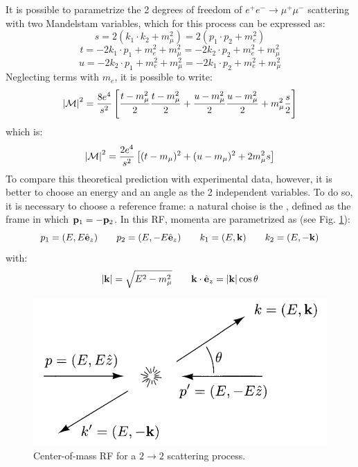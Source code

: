 It is possible to parametrize the 2 degrees of freedom of $ e^+e^- \rightarrow \mu^+\mu^- $ scattering with two Mandelstam variables, which for this process can be expressed as:
\begin{equation*}
  s = 2 (k_1 \cdot k_2 + m_\mu^2) = 2 (p_1 \cdot p_2 + m_e^2)
\end{equation*}
\begin{equation*}
  t = -2 k_1 \cdot p_1 + m_e^2 + m_\mu^2 = -2 k_2 \cdot p_2 + m_e^2 + m_\mu^2
\end{equation*}
\begin{equation*}
  u = -2 k_2 \cdot p_1 + m_e^2 + m_\mu^2 = -2 k_1 \cdot p_2 + m_e^2 + m_\mu^2
\end{equation*}
Neglecting terms with $ m_e $, it is possible to write:
\begin{equation*}
  \left\lvert\mathcal{M}\right\rvert^2 = \frac{8e^4}{s^2} \left[ \frac{t - m_\mu^2}{2} \frac{t - m_\mu^2}{2} + \frac{u - m_\mu^2}{2} \frac{u - m_\mu^2}{2} + m_\mu^2 \frac{s}{2} \right]
\end{equation*}
which is:
\begin{equation}
  \left\lvert\mathcal{M}\right\rvert^2 = \frac{2e^4}{s^2} \left[ (t - m_\mu)^2 + (u - m_\mu)^2 + 2m_\mu^2 s \right]
  \label{eq:mat-el-mand}
\end{equation}
To compare this theoretical prediction with experimental data, however, it is better to choose an energy and an angle as the 2 independent variables. To do so, it is necessary to choose a reference frame: a natural choise is the , defined as the frame in which $ \mathbf{p}_1 = - \mathbf{p}_2 $. In this RF, momenta are parametrized as (see Fig. \ref{com-rf}):
\begin{equation*}
  p_1 = (E, E \hat{\mathbf{e}}_z) \qquad p_2 = (E, -E \hat{\mathbf{e}}_z) \qquad k_1 = (E, \mathbf{k}) \qquad k_2 = (E, -\mathbf{k})
\end{equation*}
with:
\begin{equation*}
  \left\lvert\mathbf{k}\right\rvert = \sqrt{E^2 - m_\mu^2} \qquad \mathbf{k} \cdot \hat{\mathbf{e}}_z = \left\lvert\mathbf{k}\right\rvert \cos \theta
\end{equation*}

\begin{figure}
  \centering
  \includegraphics[width = 0.50 \textwidth]{imgs/com-rf.png}
  \caption{Center-of-mass RF for a $ 2 \rightarrow 2 $ scattering process.}
  \label{com-rf}
\end{figure}


